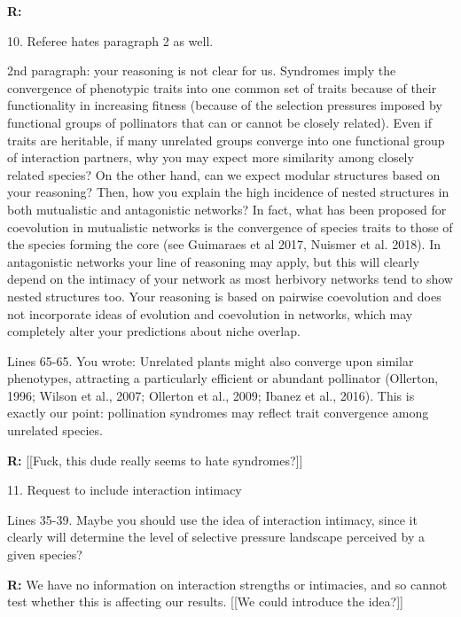 \documentclass[12pt]{letter}
\newenvironment{refquote}{\bigskip \begin{it}}{\end{it}\smallskip}
\begin{document}
		\textbf{R:}


	10. Referee hates paragraph 2 as well.

		\begin{refquote}
		2nd paragraph: your reasoning is not clear for us. Syndromes imply the convergence of phenotypic traits into one common set of traits because of their functionality in increasing fitness (because of the selection pressures imposed by functional groups of pollinators that can or cannot be closely related). Even if traits are heritable, if many unrelated groups converge into one functional group of interaction partners, why you may expect more similarity among closely related species? On the other hand, can we expect modular structures based on your reasoning? Then, how you explain the high incidence of nested structures in both mutualistic and antagonistic networks? In fact, what has been proposed for coevolution in mutualistic networks is the convergence of species traits to those of the species forming the core (see Guimaraes et al 2017, Nuismer et al. 2018). In antagonistic networks your line of reasoning may apply, but this will clearly depend on the intimacy of your network as most herbivory networks tend to show nested structures too. Your reasoning is based on pairwise coevolution and does not incorporate ideas of evolution and coevolution in networks, which may completely alter your predictions about niche overlap.
		\end{refquote}

		\begin{refquote}
		Lines 65-65. You wrote: Unrelated plants might also converge upon similar phenotypes, attracting a particularly efficient or abundant pollinator (Ollerton, 1996; Wilson et al., 2007; Ollerton et al., 2009; Ibanez et al., 2016). This is exactly our point: pollination syndromes may reflect trait convergence among unrelated species.
		\end{refquote}

		\textbf{R:} [[Fuck, this dude really seems to hate syndromes?]]


	11. Request to include interaction intimacy

		\begin{refquote}
		Lines 35-39. Maybe you should use the idea of interaction intimacy, since it clearly will determine the level of selective pressure landscape perceived by a given species?
		\end{refquote}

		\textbf{R:} We have no information on interaction strengths or intimacies, and so cannot test whether this is affecting our results. [[We could introduce the idea?]]
\end{document}
